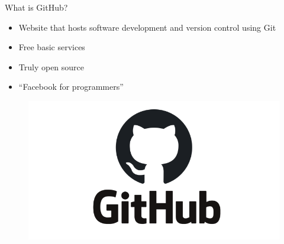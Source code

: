 \documentclass[
  ignorenonframetext,
]{beamer}
\providecommand{\tightlist}{%
  \setlength{\itemsep}{0pt}\setlength{\parskip}{0pt}}
\begin{document}
\begin{frame}{What is GitHub?}
\protect\hypertarget{what-is-github}{}

\begin{itemize}
\tightlist
\item
  Website that hosts software development and version control using Git
\item
  Free basic services
\item
  Truly open source
\item
  ``Facebook for programmers''
\end{itemize}

\begin{figure}
  \includegraphics[scale=0.2]{slides_files/figure-beamer/GitHub.png}
\end{figure}

\end{frame}
\end{document}
